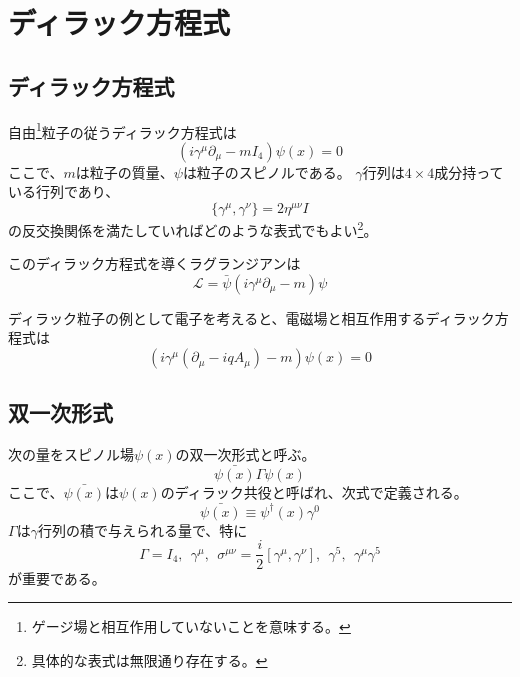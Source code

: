 
\chapter{ディラック方程式}
\section{ディラック方程式}

自由\footnote{ゲージ場と相互作用していないことを意味する。}粒子の従うディラック方程式は
\begin{equation}
  (i\gamma^{\mu}\partial_{\mu}-mI_4)\psi(x)=0
\end{equation}
ここで、$m$は粒子の質量、$\psi$は粒子のスピノルである。
$\gamma$行列は$4\times4$成分持っている行列であり、
\begin{equation}
  \{ \gamma^{\mu}, \gamma^{\nu} \} = 2\eta^{\mu\nu}I
\end{equation}
の反交換関係を満たしていればどのような表式でもよい\footnote{具体的な表式は無限通り存在する。}。

このディラック方程式を導くラグランジアンは
\begin{equation}
  \mathcal{L}=\bar{\psi}(i\gamma^{\mu}\partial_{\mu}-m)\psi
\end{equation}

ディラック粒子の例として電子を考えると、電磁場と相互作用するディラック方程式は
\begin{equation}
  (i\gamma^{\mu}(\partial_{\mu}-iqA_\mu)-m)\psi(x)=0
\end{equation}

\section{双一次形式}

次の量をスピノル場$\psi(x)$の双一次形式と呼ぶ。
\begin{equation}
  \bar{\psi(x)}\Gamma\psi(x)
\end{equation}
ここで、$\bar{\psi(x)}$は$\psi(x)$のディラック共役と呼ばれ、次式で定義される。
\begin{equation}
  \bar{\psi(x)} \equiv \psi^{\dagger}(x)\gamma^0
\end{equation}
$\Gamma$は$\gamma$行列の積で与えられる量で、特に
\begin{equation}
  \Gamma=I_4,~~\gamma^\mu,~~ \sigma^{\mu\nu}=\frac{i}{2}[ \gamma^\mu,\gamma^\nu ],~~\gamma^5,~~ \gamma^\mu\gamma^5
\end{equation}
が重要である。

